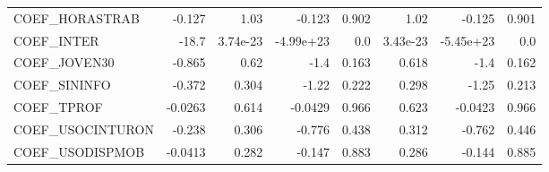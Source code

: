 \begin{tabular}{lrrrrrrr}
COEF\_HORASTRAB   &   -0.127 &     1.03 &    -0.123 &    0.902 &          1.02 &       -0.125 &         0.901 \\
COEF\_INTER       &    -18.7 & 3.74e-23 & -4.99e+23 &      0.0 &      3.43e-23 &    -5.45e+23 &           0.0 \\
COEF\_JOVEN30     &   -0.865 &     0.62 &      -1.4 &    0.163 &         0.618 &         -1.4 &         0.162 \\
COEF\_SININFO     &   -0.372 &    0.304 &     -1.22 &    0.222 &         0.298 &        -1.25 &         0.213 \\
COEF\_TPROF       &  -0.0263 &    0.614 &   -0.0429 &    0.966 &         0.623 &      -0.0423 &         0.966 \\
COEF\_USOCINTURON &   -0.238 &    0.306 &    -0.776 &    0.438 &         0.312 &       -0.762 &         0.446 \\
COEF\_USODISPMOB  &  -0.0413 &    0.282 &    -0.147 &    0.883 &         0.286 &       -0.144 &         0.885 \\
\bottomrule
\end{tabular}

